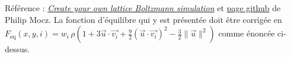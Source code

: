 \documentclass[11pt,class=report,crop=false]{standalone}
\begin{document}
\bigskip

Référence :  \href{https://medium.com/swlh/create-your-own-lattice-boltzmann-simulation-with-python-8759e8b53b1c}{\emph{Create your own lattice Boltzmann simulation}}
et  
\href{https://github.com/pmocz/latticeboltzmann-python}{page github}
de Philip Mocz.
La fonction d'équilibre qui y est présentée doit être corrigée en
 $F_{\text{eq}} (x,y,i) = w_i \, \rho \left(1 + 3 \vec{u} \cdot \vec{v_i}  +  \frac92(\vec{u} \cdot \vec{v_i})^2 - \frac32 \| \vec u \| ^2 \right)$
 comme énoncée ci-dessus.
\end{document}
